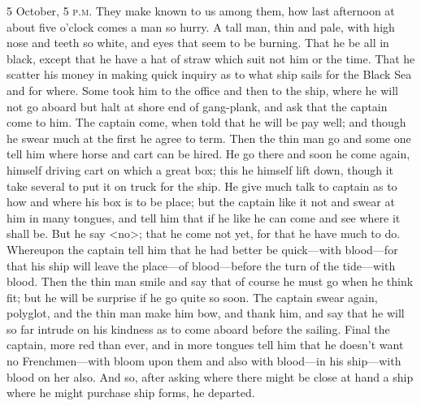 \begin{diary}{5 October, 5 \textsc{p.m.}}
They make known to us among them, how last afternoon at about five o'clock comes a man so hurry. A tall man, thin and pale, with high nose and teeth so white, and eyes that seem to be burning. That he be all in black, except that he have a hat of straw which suit not him or the time. That he scatter his money in making quick inquiry as to what ship sails for the Black Sea and for where. Some took him to the office and then to the ship, where he will not go aboard but halt at shore end of gang-plank, and ask that the captain come to him. The captain come, when told that he will be pay well; and though he swear much at the first he agree to term. Then the thin man go and some one tell him where horse and cart can be hired. He go there and soon he come again, himself driving cart on which a great box; this he himself lift down, though it take several to put it on truck for the ship. He give much talk to captain as to how and where his box is to be place; but the captain like it not and swear at him in many tongues, and tell him that if he like he can come and see where it shall be. But he say <no>; that he come not yet, for that he have much to do. Whereupon the captain tell him that he had better be quick—with blood—for that his ship will leave the place—of blood—before the turn of the tide—with blood. Then the thin man smile and say that of course he must go when he think fit; but he will be surprise if he go quite so soon. The captain swear again, polyglot, and the thin man make him bow, and thank him, and say that he will so far intrude on his kindness as to come aboard before the sailing. Final the captain, more red than ever, and in more tongues tell him that he doesn't want no Frenchmen—with bloom upon them and also with blood—in his ship—with blood on her also. And so, after asking where there might be close at hand a ship where he might purchase ship forms, he departed.


\end{diary}
